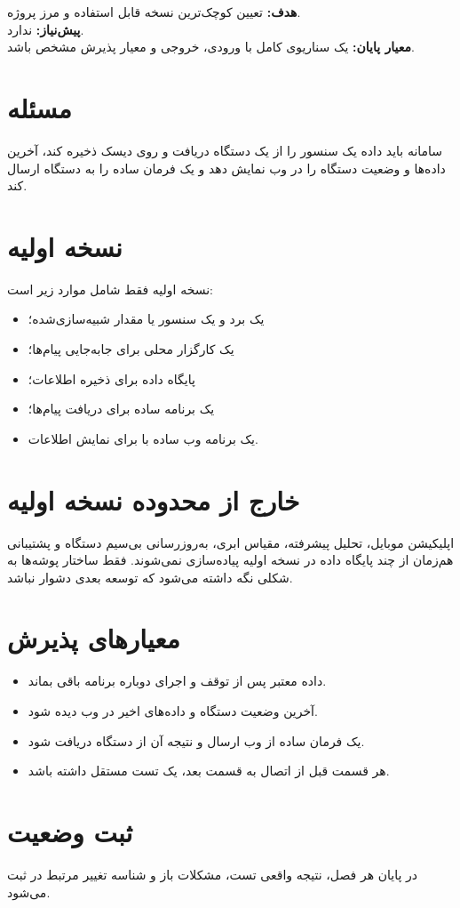 \begin{phasebox}
\textbf{هدف:} تعیین کوچک‌ترین نسخه قابل استفاده و مرز پروژه.\\
\textbf{پیش‌نیاز:} ندارد.\\
\textbf{معیار پایان:} یک سناریوی کامل با ورودی، خروجی و معیار پذیرش مشخص باشد.
\end{phasebox}

\section{مسئله}
سامانه باید داده یک سنسور را از یک دستگاه دریافت و روی دیسک ذخیره کند، آخرین داده‌ها و وضعیت دستگاه را در وب نمایش دهد و یک فرمان ساده را به دستگاه ارسال کند.

\section{نسخه اولیه}
نسخه اولیه فقط شامل موارد زیر است:

\begin{itemize}
    \item یک برد
    و یک سنسور یا مقدار شبیه‌سازی‌شده؛
    \item یک کارگزار محلی
    برای جابه‌جایی پیام‌ها؛
    \item پایگاه داده
    برای ذخیره اطلاعات؛
    \item یک برنامه ساده
    برای دریافت پیام‌ها؛
    \item یک برنامه وب ساده با
    برای نمایش اطلاعات.
\end{itemize}

\section{خارج از محدوده نسخه اولیه}
اپلیکیشن موبایل، تحلیل پیشرفته، مقیاس ابری، به‌روزرسانی بی‌سیم دستگاه و پشتیبانی هم‌زمان از چند پایگاه داده در نسخه اولیه پیاده‌سازی نمی‌شوند. فقط ساختار پوشه‌ها به شکلی نگه داشته می‌شود که توسعه بعدی دشوار نباشد.

\section{معیارهای پذیرش}
\begin{itemize}
    \item داده معتبر پس از توقف و اجرای دوباره برنامه باقی بماند.
    \item آخرین وضعیت دستگاه و داده‌های اخیر در وب دیده شود.
    \item یک فرمان ساده از وب ارسال و نتیجه آن از دستگاه دریافت شود.
    \item هر قسمت قبل از اتصال به قسمت بعد، یک تست مستقل داشته باشد.
\end{itemize}

\section{ثبت وضعیت}
در پایان هر فصل، نتیجه واقعی تست، مشکلات باز و شناسه تغییر مرتبط در
ثبت می‌شود.
